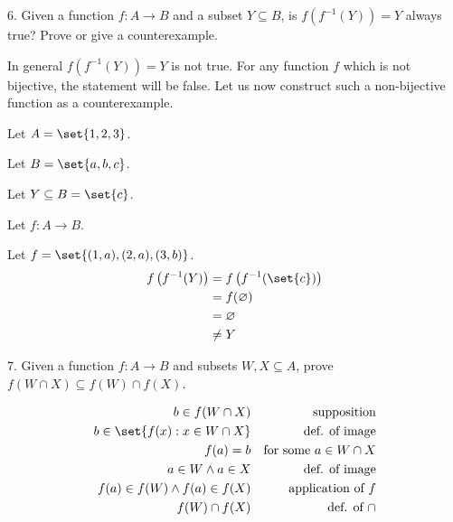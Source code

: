 \documentclass{hippoidC}
\begin{document}
\begin{prooflist}{6. Given a function $f: A \rightarrow B$ and a subset $Y
    \subseteq B$, is $f\left(f^{-1}(Y)\right)=Y$ always true? Prove or give a
counterexample.}
\item \imagedef{}
\item In general $f\left(f^{-1}(Y)\right)=Y$ is not true. For any function $f$
    which is not bijective, the statement will be false. Let us now construct
    such a non-bijective function as a counterexample.
\item Let $A=\set{1, 2, 3}$.
\item Let $B=\set{a, b, c}$.
\item Let $Y\subseteq B = \set{c}$.
\item Let $f: A \rightarrow B$.
\item Let $f = \set{(1, a), (2, a), (3, b)}$.
\begin{align*}
    f\left(f^{-1}(Y)\right) &= f\left(f^{-1}(\set{c})\right)\\
    &= f(\varnothing)\\
    &= \varnothing\\
    &\neq Y
\end{align*}
\end{prooflist}

\begin{prooflist}{7. Given a function $f: A \rightarrow B$ and subsets $W, X \subseteq A$, prove $f(W \cap X) \subseteq f(W) \cap f(X)$.}
\item \imagedef{}
\begin{align*}
    b\in f(W\cap X) && \text{supposition}\\
    b\in \set{f(x): x \in W\cap X} && \text{def. of image}\\
    f(a) = b && \text{for some }a\in W\cap X\\
    a \in W \land a \in X&&\text{def. of image}\\
    f(a) \in f(W) \land f(a) \in f(X)&&\text{application of }f\\
    f(W) \cap f(X)&&\text{def. of }\cap
\end{align*}
\end{prooflist}
\end{document}
